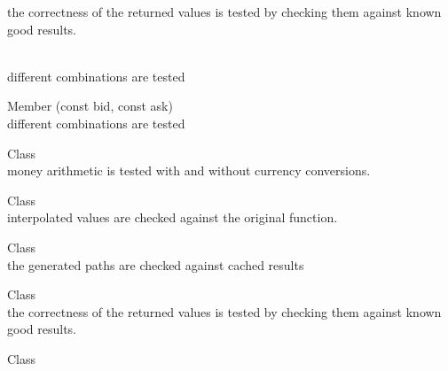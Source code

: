 \begin{DoxyRefList}
\label{test__test000059}%
%
the correctness of the returned values is tested by checking them against known good results.  
\item[Member \doxylink{namespace_quant_lib_a7b3f26a68fab37e12b876996fa6f97d6}{Quant\+Lib\+::mid\+Equivalent} (const \doxylink{namespace_quant_lib_a372ac5c1a422a6b276fe0552d4d83f50}{Real} bid, const \doxylink{namespace_quant_lib_a372ac5c1a422a6b276fe0552d4d83f50}{Real} ask, const \doxylink{namespace_quant_lib_a372ac5c1a422a6b276fe0552d4d83f50}{Real} last, const \doxylink{namespace_quant_lib_a372ac5c1a422a6b276fe0552d4d83f50}{Real} close)]\hfill \\
\label{test__test000090}%
%
different combinations are tested  
\item[Member \doxylink{namespace_quant_lib_a66e521fe74905cba90e87a2521b78b79}{Quant\+Lib\+::mid\+Safe} (const \doxylink{namespace_quant_lib_a372ac5c1a422a6b276fe0552d4d83f50}{Real} bid, const \doxylink{namespace_quant_lib_a372ac5c1a422a6b276fe0552d4d83f50}{Real} ask)]\hfill \\
\label{test__test000091}%
%
different combinations are tested  
\item[Class \doxylink{class_quant_lib_1_1_money}{Quant\+Lib\+::Money} ]\hfill \\
\label{test__test000089}%
%
money arithmetic is tested with and without currency conversions.  
\item[Class \doxylink{class_quant_lib_1_1_multi_cubic_spline}{Quant\+Lib\+::Multi\+Cubic\+Spline\texorpdfstring{$<$}{<} i \texorpdfstring{$>$}{>}} ]\hfill \\
\label{test__test000048}%
%
interpolated values are checked against the original function. 
\item[Class \doxylink{class_quant_lib_1_1_multi_path_generator}{Quant\+Lib\+::Multi\+Path\+Generator\texorpdfstring{$<$}{<} GSG \texorpdfstring{$>$}{>}} ]\hfill \\
\label{test__test000084}%
%
the generated paths are checked against cached results  
\item[Class \doxylink{class_quant_lib_1_1_newton}{Quant\+Lib\+::Newton} ]\hfill \\
\label{test__test000072}%
%
the correctness of the returned values is tested by checking them against known good results. 
\item[Class \doxylink{class_quant_lib_1_1_newton_safe}{Quant\+Lib\+::Newton\+Safe} ]\hfill \\

\end{DoxyRefList}
